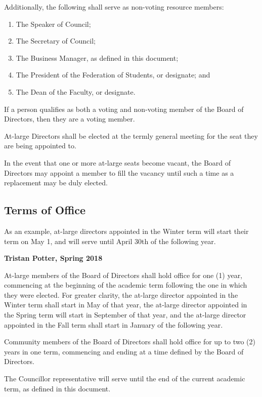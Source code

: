 \noindent Additionally, the following shall serve as non-voting resource
members:
\begin{enumerate}
  \item The Speaker of Council;
  \item The Secretary of Council;
  \item The Business Manager, as defined in this document;
  \item The President of the Federation of Students, or designate; and
  \item The Dean of the Faculty, or designate.
\end{enumerate}

If a person qualifies as both a voting and non-voting member of the Board of 
Directors, then they are a voting member.

At-large Directors shall be elected at the termly general meeting for the
seat they are being appointed to.

In the event that one or more at-large seats become vacant, the Board of
Directors may appoint a member to fill the vacancy until such a time as a
replacement may be duly elected.

\subsection{Terms of Office}
\begin{annotation}
    As an example, at-large directors appointed in the Winter term will start
    their term on May 1, and will serve until April 30th of the following year.

    \textbf{Tristan Potter, Spring 2018}
\end{annotation}
At-large members of the Board of Directors shall hold office for one (1) year,
commencing at the beginning of the academic term following the one in which
they were elected. For greater clarity, the at-large director appointed in
the Winter term shall start in May of that year, the at-large director 
appointed in the Spring term will start in September of that year, and the
at-large director appointed in the Fall term shall start in January of the 
following year. 

Community members of the Board of Directors shall hold office for up to two (2)
years in one term, commencing and ending at a time defined by the Board of
Directors.

The Councillor representative will serve until the end of the current academic
term, as defined in this document. 

